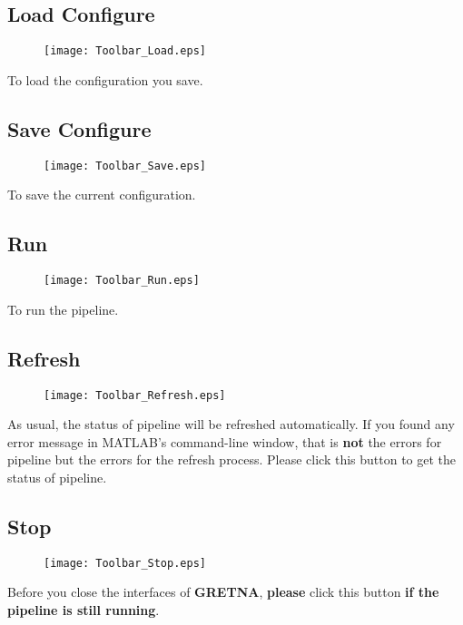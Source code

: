 \documentclass[11pt]{article}
\begin{document}
		\subsection{Load Configure}
			\begin{figure}
				\begin{center}
					\texttt{[image: Toolbar\_Load.eps]}
				\end{center}
			\end{figure}
			To load the configuration you save.
		\subsection{Save Configure}
			\begin{figure}
				\begin{center}
					\texttt{[image: Toolbar\_Save.eps]}
				\end{center}
			\end{figure}
			To save the current configuration.
		\subsection{Run}
			\begin{figure}
				\begin{center}
					\texttt{[image: Toolbar\_Run.eps]}
				\end{center}
			\end{figure}
			To run the pipeline.
		\subsection{Refresh}
			\begin{figure}
				\begin{center}
					\texttt{[image: Toolbar\_Refresh.eps]}
				\end{center}
			\end{figure}
			As usual, the status of pipeline will be refreshed automatically. 
			If you found any error message in MATLAB's command-line window, 
			that is \textbf{not} the errors for pipeline but the errors for the refresh process.
			Please click this button to get the status of pipeline.
		\subsection{Stop}
			\begin{figure}
				\begin{center}
					\texttt{[image: Toolbar\_Stop.eps]}
				\end{center}
			\end{figure}
			Before you close the interfaces of \textbf{GRETNA}, 
			\textbf{please} click this button \textbf{if the pipeline is still running}.
\end{document}
